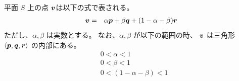 \documentclass[11pt,a4j]{jarticle}
\begin{document}
  
平面 $S$ 上の点 ${\bm{v}}$は以下の式で表される。
  \begin{eqnarray}
    {\bm{v}}
      & = &
        \alpha {\bm{p}} + \beta {\bm{q}} + (1-\alpha-\beta){\bm{r}}
  \end{eqnarray}
ただし、$\alpha, \beta$ は実数とする。
なお、$\alpha, \beta$ が以下の範囲の時、
${\bm{v}}$ は三角形 $\left< {\bm{p}},{\bm{q}},{\bm{r}} \right>$ の内部にある。
  \begin{eqnarray}
    & 0 < \alpha < 1
  \\
    & 0 < \beta < 1
  \\
    & 0 < (1-\alpha-\beta) < 1
  \end{eqnarray}
\end{document}

